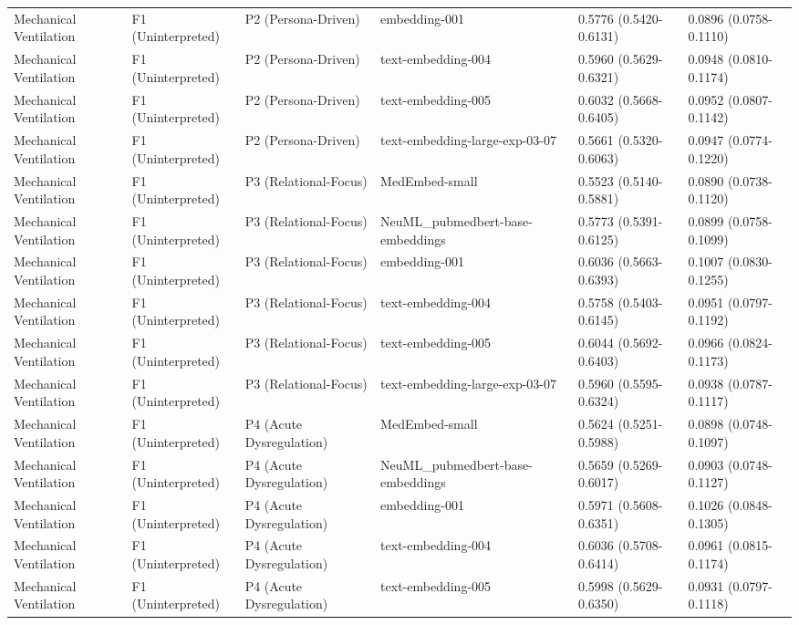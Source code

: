 \begin{tabular}{llllll}
Mechanical Ventilation & F1 (Uninterpreted) & P2 (Persona-Driven) & embedding-001 & 0.5776 (0.5420-0.6131) & 0.0896 (0.0758-0.1110) \\
Mechanical Ventilation & F1 (Uninterpreted) & P2 (Persona-Driven) & text-embedding-004 & 0.5960 (0.5629-0.6321) & 0.0948 (0.0810-0.1174) \\
Mechanical Ventilation & F1 (Uninterpreted) & P2 (Persona-Driven) & text-embedding-005 & 0.6032 (0.5668-0.6405) & 0.0952 (0.0807-0.1142) \\
Mechanical Ventilation & F1 (Uninterpreted) & P2 (Persona-Driven) & text-embedding-large-exp-03-07 & 0.5661 (0.5320-0.6063) & 0.0947 (0.0774-0.1220) \\
Mechanical Ventilation & F1 (Uninterpreted) & P3 (Relational-Focus) & MedEmbed-small & 0.5523 (0.5140-0.5881) & 0.0890 (0.0738-0.1120) \\
Mechanical Ventilation & F1 (Uninterpreted) & P3 (Relational-Focus) & NeuML\_pubmedbert-base-embeddings & 0.5773 (0.5391-0.6125) & 0.0899 (0.0758-0.1099) \\
Mechanical Ventilation & F1 (Uninterpreted) & P3 (Relational-Focus) & embedding-001 & 0.6036 (0.5663-0.6393) & 0.1007 (0.0830-0.1255) \\
Mechanical Ventilation & F1 (Uninterpreted) & P3 (Relational-Focus) & text-embedding-004 & 0.5758 (0.5403-0.6145) & 0.0951 (0.0797-0.1192) \\
Mechanical Ventilation & F1 (Uninterpreted) & P3 (Relational-Focus) & text-embedding-005 & 0.6044 (0.5692-0.6403) & 0.0966 (0.0824-0.1173) \\
Mechanical Ventilation & F1 (Uninterpreted) & P3 (Relational-Focus) & text-embedding-large-exp-03-07 & 0.5960 (0.5595-0.6324) & 0.0938 (0.0787-0.1117) \\
Mechanical Ventilation & F1 (Uninterpreted) & P4 (Acute Dysregulation) & MedEmbed-small & 0.5624 (0.5251-0.5988) & 0.0898 (0.0748-0.1097) \\
Mechanical Ventilation & F1 (Uninterpreted) & P4 (Acute Dysregulation) & NeuML\_pubmedbert-base-embeddings & 0.5659 (0.5269-0.6017) & 0.0903 (0.0748-0.1127) \\
Mechanical Ventilation & F1 (Uninterpreted) & P4 (Acute Dysregulation) & embedding-001 & 0.5971 (0.5608-0.6351) & 0.1026 (0.0848-0.1305) \\
Mechanical Ventilation & F1 (Uninterpreted) & P4 (Acute Dysregulation) & text-embedding-004 & 0.6036 (0.5708-0.6414) & 0.0961 (0.0815-0.1174) \\
Mechanical Ventilation & F1 (Uninterpreted) & P4 (Acute Dysregulation) & text-embedding-005 & 0.5998 (0.5629-0.6350) & 0.0931 (0.0797-0.1118) \\

\end{tabular}
